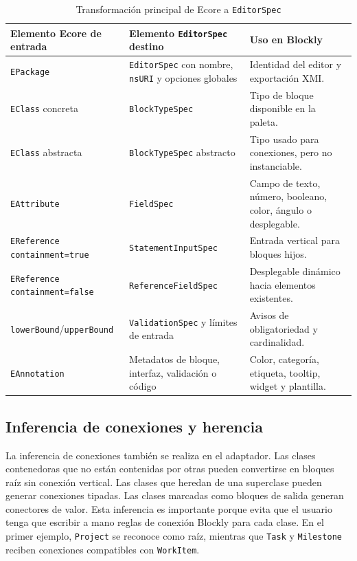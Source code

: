 \begin{table}[H]
  \centering
  \small
  \begin{tabular}{|L{0.30\textwidth}|L{0.30\textwidth}|L{0.26\textwidth}|}
    \hline
    Elemento Ecore de entrada & Elemento \texttt{EditorSpec} destino & Uso en Blockly \\
    \hline
    \texttt{EPackage} & \texttt{EditorSpec} con nombre, \texttt{nsURI} y opciones
    globales & Identidad del editor y exportación XMI. \\
    \texttt{EClass} concreta & \texttt{BlockTypeSpec} & Tipo de bloque disponible en
    la paleta. \\
    \texttt{EClass} abstracta & \texttt{BlockTypeSpec} abstracto & Tipo usado para
    conexiones, pero no instanciable. \\
    \texttt{EAttribute} & \texttt{FieldSpec} & Campo de texto, número, booleano,
    color, ángulo o desplegable. \\
    \texttt{EReference containment=true} & \texttt{StatementInputSpec} & Entrada
    vertical para bloques hijos. \\
    \texttt{EReference containment=false} & \texttt{ReferenceFieldSpec} & Desplegable
    dinámico hacia elementos existentes. \\
    \texttt{lowerBound}/\texttt{upperBound} & \texttt{ValidationSpec} y límites de
    entrada & Avisos de obligatoriedad y cardinalidad. \\
    \texttt{EAnnotation} & Metadatos de bloque, interfaz, validación o código &
    Color, categoría, etiqueta, tooltip, widget y plantilla. \\
    \hline
  \end{tabular}
  \caption{Transformación principal de Ecore a \texttt{EditorSpec}}
  \label{tab:transformacion-ecore-editor-spec}
\end{table}

\subsection{Inferencia de conexiones y herencia}

La inferencia de conexiones también se realiza en el adaptador. Las clases
contenedoras que no están contenidas por otras pueden convertirse en bloques
raíz sin conexión vertical. Las clases que heredan de una superclase pueden
generar conexiones tipadas. Las clases marcadas como bloques de salida generan
conectores de valor. Esta inferencia es importante porque evita que el usuario
tenga que escribir a mano reglas de conexión Blockly para cada clase. En el
primer ejemplo, \texttt{Project} se reconoce como raíz, mientras que
\texttt{Task} y \texttt{Milestone} reciben conexiones compatibles con
\texttt{WorkItem}.

